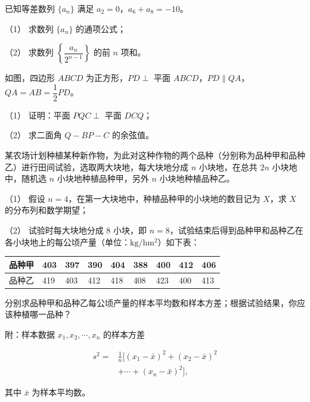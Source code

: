 \begin{question}
已知等差数列 $\{a_n\}$ 满足 $a_2=0$，$a_6+a_8=-10$。

（1） 求数列 $\{a_n\}$ 的通项公式；

（2） 求数列 $\left\{\dfrac{a_n}{2^{n-1}}\right\}$ 的前 $n$ 项和。

\Needspace{0.4\textheight}
\end{question}
\begin{question}
如图，四边形 $ABCD$ 为正方形，$PD\perp$ 平面 $ABCD$，$PD\parallel QA$，$QA=AB=\dfrac12PD$。

（1） 证明：平面 $PQC\perp$ 平面 $DCQ$；

（2） 求二面角 $Q-BP-C$ 的余弦值。
\nopagebreak[4]
\begin{center}\end{center}
\nopagebreak[4]
\end{question}
\begin{question}
某农场计划种植某种新作物，为此对这种作物的两个品种（分别称为品种甲和品种乙）进行田间试验，选取两大块地，每大块地分成 $n$ 小块地，在总共 $2n$ 小块地中，随机选 $n$ 小块地种植品种甲，另外 $n$ 小块地种植品种乙。

（1） 假设 $n=4$，在第一大块地中，种植品种甲的小块地的数目记为 $X$，求 $X$ 的分布列和数学期望；

（2） 试验时每大块地分成 $8$ 小块，即 $n=8$，试验结束后得到品种甲和品种乙在各小块地上的每公顷产量（单位：$\mathrm{kg/hm^2}$）如下表：

\begin{center}
\begingroup\setlength{\tabcolsep}{4pt}
\begin{tabular}{lllllllll}
\toprule
品种甲 & 403 & 397 & 390 & 404 & 388 & 400 & 412 & 406 \\
\midrule
品种乙 & 419 & 403 & 412 & 418 & 408 & 423 & 400 & 413 \\
\bottomrule
\end{tabular}
\endgroup
\end{center}

分别求品种甲和品种乙每公顷产量的样本平均数和样本方差；根据试验结果，你应该种植哪一品种？

附：样本数据 $x_1,x_2,\cdots,x_n$ 的样本方差

\nopagebreak[4]
\[\begin{aligned}
s^2={}&\frac1n\bigl[(x_1-\bar x)^2+(x_2-\bar x)^2\\
&+\cdots+(x_n-\bar x)^2\bigr],
\end{aligned}\]

其中 $\bar x$ 为样本平均数。

\Needspace{0.4\textheight}
\end{question}
